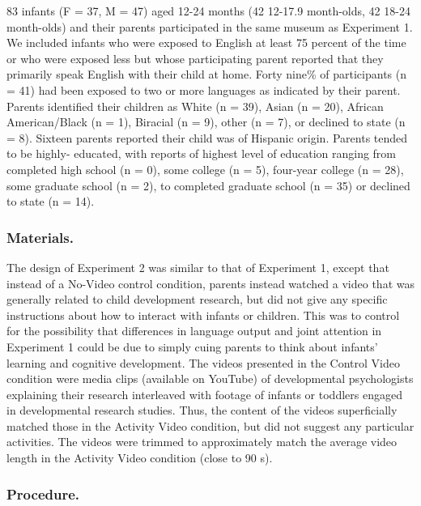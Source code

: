 \documentclass[]{article}
\begin{document}
83 infants (F = 37, M = 47) aged 12-24 months (42 12-17.9 month-olds, 42
18-24 month-olds) and their parents participated in the same museum as
Experiment 1. We included infants who were exposed to English at least
75 percent of the time or who were exposed less but whose participating
parent reported that they primarily speak English with their child at
home. Forty nine\% of participants (n = 41) had been exposed to two or
more languages as indicated by their parent. Parents identified their
children as White (n = 39), Asian (n = 20), African American/Black (n =
1), Biracial (n = 9), other (n = 7), or declined to state (n = 8).
Sixteen parents reported their child was of Hispanic origin. Parents
tended to be highly- educated, with reports of highest level of
education ranging from completed high school (n = 0), some college (n =
5), four-year college (n = 28), some graduate school (n = 2), to
completed graduate school (n = 35) or declined to state (n = 14).

\hypertarget{materials.-1}{%
\subsubsection{Materials.}\label{materials.-1}}

The design of Experiment 2 was similar to that of Experiment 1, except
that instead of a No-Video control condition, parents instead watched a
video that was generally related to child development research, but did
not give any specific instructions about how to interact with infants or
children. This was to control for the possibility that differences in
language output and joint attention in Experiment 1 could be due to
simply cuing parents to think about infants' learning and cognitive
development. The videos presented in the Control Video condition were
media clips (available on YouTube) of developmental psychologists
explaining their research interleaved with footage of infants or
toddlers engaged in developmental research studies. Thus, the content of
the videos superficially matched those in the Activity Video condition,
but did not suggest any particular activities. The videos were trimmed
to approximately match the average video length in the Activity Video
condition (close to 90 s).

\hypertarget{procedure.-1}{%
\subsubsection{Procedure.}\label{procedure.-1}}
\end{document}
